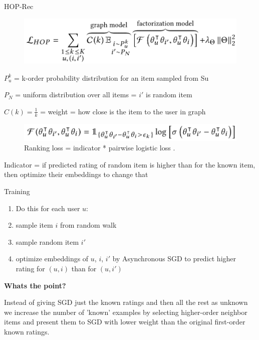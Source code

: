 \documentclass{beamer}
\begin{document}
\begin{frame}{HOP-Rec}

\begin{figure}[h]
\includegraphics[scale=0.60]{img/loss}
\end{figure}

$P_u^k$ = k-order probability distribution for an
item sampled from Su

$P_N$ = uniform distribution over all items = $i'$ is random item

$C(k) = \frac{1}{k}$ = weight = how close is the item to the user in graph

\begin{figure}[h]
\includegraphics[scale=0.60]{img/log-loss}
\caption{Ranking loss = indicator * pairwise logistic loss \cite{cit:hop-rec}.}
\end{figure}

Indicator = if predicted rating of random item is higher than for the known item, then optimize their embeddings to change that

\end{frame}
\begin{frame}{Training}

\begin{enumerate}
\item Do this for each user $u$:
\item sample item $i$ from random walk
\item sample random item $i'$
\item optimize embeddings of $u$, $i$, $i'$ by Asynchronous SGD to predict higher rating for $(u,i)$ than for $(u,i')$ 
\end{enumerate}
\vfill
\textbf{Whats the point?}

Instead of giving SGD just the known ratings and then all the rest as unknown we increase the number of 'known' examples by selecting higher-order neighbor items and present them to SGD with lower weight than the original first-order known ratings.

\end{frame}
\end{document}
